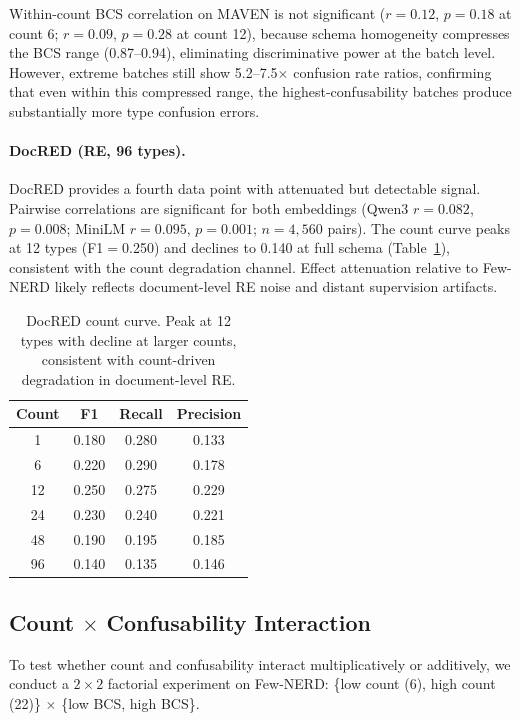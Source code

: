 \documentclass[11pt,a4paper]{article}
\begin{document}
Within-count BCS correlation on MAVEN is not significant ($r{=}0.12$, $p{=}0.18$ at count 6; $r{=}0.09$, $p{=}0.28$ at count 12), because schema homogeneity compresses the BCS range (0.87--0.94), eliminating discriminative power at the batch level.
However, extreme batches still show 5.2--7.5$\times$ confusion rate ratios, confirming that even within this compressed range, the highest-confusability batches produce substantially more type confusion errors.

\paragraph{DocRED (RE, 96 types).}
DocRED provides a fourth data point with attenuated but detectable signal.
Pairwise correlations are significant for both embeddings (Qwen3 $r{=}0.082$, $p{=}0.008$; MiniLM $r{=}0.095$, $p{=}0.001$; $n{=}4{,}560$ pairs).
The count curve peaks at 12 types (F1$=$0.250) and declines to 0.140 at full schema (Table~\ref{tab:docred-count}), consistent with the count degradation channel.
Effect attenuation relative to Few-NERD likely reflects document-level RE noise and distant supervision artifacts.

\begin{table}[t]
\centering
\small
\begin{tabular}{cccc}
\toprule
\textbf{Count} & \textbf{F1} & \textbf{Recall} & \textbf{Precision} \\
\midrule
1  & 0.180 & 0.280 & 0.133 \\
6  & 0.220 & 0.290 & 0.178 \\
12 & 0.250 & 0.275 & 0.229 \\
24 & 0.230 & 0.240 & 0.221 \\
48 & 0.190 & 0.195 & 0.185 \\
96 & 0.140 & 0.135 & 0.146 \\
\bottomrule
\end{tabular}
\caption{DocRED count curve. Peak at 12 types with decline at larger counts, consistent with count-driven degradation in document-level RE.}
\label{tab:docred-count}
\end{table}


\subsection{Count $\times$ Confusability Interaction}
\label{sec:interaction}

To test whether count and confusability interact multiplicatively or additively, we conduct a $2{\times}2$ factorial experiment on Few-NERD: \{low count (6), high count (22)\} $\times$ \{low BCS, high BCS\}.
\end{document}
